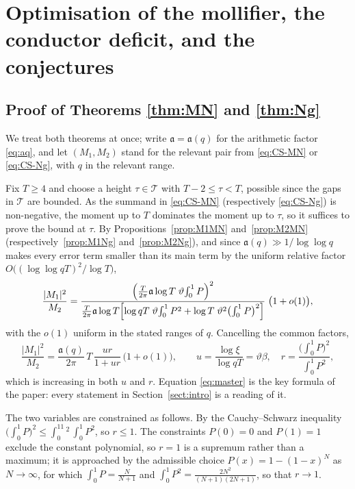 \documentclass[10pt,a4paper]{amsart}
\numberwithin{equation}{section}
\begin{document}
\section{Optimisation of the mollifier, the conductor deficit, and the conjectures}\label{sect:opt}

\subsection{Proof of Theorems \ref{thm:MN} and \ref{thm:Ng}}
We treat both theorems at once; write $\mathfrak a=\mathfrak a(q)$ for the arithmetic factor \eqref{eq:aq}, and let $(M_1,M_2)$ stand for the relevant pair from \eqref{eq:CS-MN} or \eqref{eq:CS-Ng}, with $q$ in the relevant range.

Fix $T\ge4$ and choose a height $\tau\in\mathcal T$ with $T-2\le\tau<T$, possible since the gaps in $\mathcal T$ are bounded. As the summand in \eqref{eq:CS-MN} (respectively \eqref{eq:CS-Ng}) is non-negative, the moment up to $T$ dominates the moment up to $\tau$, so it suffices to prove the bound at $\tau$. By Propositions~\ref{prop:M1MN} and~\ref{prop:M2MN} (respectively~\ref{prop:M1Ng} and~\ref{prop:M2Ng}), and since $\mathfrak a(q)\gg1/\log\log q$ makes every error term smaller than its main term by the uniform relative factor $O\bigl((\log\log qT)^2/\log T\bigr)$,
\[
\frac{|M_1|^2}{M_2}
=\frac{\Bigl(\frac{T}{2\pi}\mathfrak a\log T\;\vartheta\!\int_0^1 P\Bigr)^2}{\frac{T}{2\pi}\mathfrak a\log T\Bigl[\log qT\;\vartheta\!\int_0^1 P^2+\log T\;\vartheta^2\bigl(\int_0^1 P\bigr)^2\Bigr]}\;\bigl(1+o(1)\bigr),
\]
with the $o(1)$ uniform in the stated ranges of $q$. Cancelling the common factors,
\begin{equation}\label{eq:master}
\frac{|M_1|^2}{M_2}=\frac{\mathfrak a(q)}{2\pi}\,T\,\frac{ur}{1+ur}\,\bigl(1+o(1)\bigr),
\qquad
u=\frac{\log\xi}{\log qT}=\vartheta\beta,
\quad
r=\frac{\bigl(\int_0^1 P\bigr)^2}{\int_0^1 P^2},
\end{equation}
which is increasing in both $u$ and $r$. Equation \eqref{eq:master} is the key formula of the paper: every statement in Section~\ref{sect:intro} is a reading of it.

The two variables are constrained as follows. By the Cauchy--Schwarz inequality $\bigl(\int_0^1 P\bigr)^2\le\int_0^11^2\,\int_0^1P^2$, so $r\le1$. The constraints $P(0)=0$ and $P(1)=1$ exclude the constant polynomial, so $r=1$ is a supremum rather than a maximum; it is approached by the admissible choice $P(x)=1-(1-x)^N$ as $N\to\infty$, for which $\int_0^1P=\tfrac{N}{N+1}$ and $\int_0^1P^2=\tfrac{2N^2}{(N+1)(2N+1)}$, so that $r\to1$.
\end{document}

